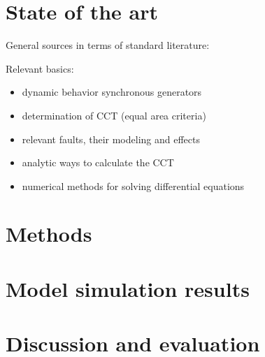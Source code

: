 
\chapter{State of the art}
\label{chap:sota}

General sources in terms of standard literature: \autocite{oedingElektrischeKraftwerkeUnd2016,gloverPowerSystemAnalysis2017,kundurPowerSystemStability2022,machowskiPowerSystemDynamics2020}

Relevant basics:
\begin{itemize}
        \item dynamic behavior synchronous generators
        \item determination of \acs{CCT} (equal area criteria)
        \item relevant faults, their modeling and effects
        \item analytic ways to calculate the \acs{CCT}
        \item numerical methods for solving differential equations
\end{itemize}

\chapter{Methods}
\label{chap:methods}

\chapter{Model simulation results}
\label{chap:results}

\chapter{Discussion and evaluation}
\label{chap:discussion}
